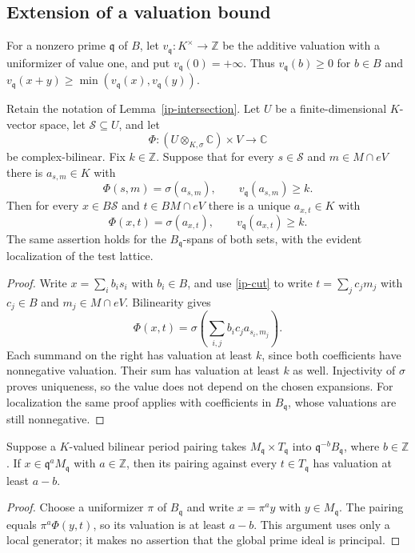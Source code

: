 \subsection{Extension of a valuation bound}

For a nonzero prime $\mathfrak q$ of $B$, let
$v_{\mathfrak q}:K^\times\to\mathbb Z$ be the additive valuation
with a uniformizer of value one, and put $v_{\mathfrak q}(0)=+\infty$.
Thus $v_{\mathfrak q}(b)\ge0$ for $b\in B$ and
$v_{\mathfrak q}(x+y)\ge\min(v_{\mathfrak q}(x),v_{\mathfrak q}(y))$.

\begin{proposition}\label{ip-valuation}
Retain the notation of Lemma~\ref{ip-intersection}. Let $U$ be a
finite-dimensional $K$-vector space, let $\mathcal S\subseteq U$,
and let
\[
 \Phi:(U\otimes_{K,\sigma}\mathbb C)\times V\longrightarrow\mathbb C
\]
be complex-bilinear. Fix $k\in\mathbb Z$. Suppose that for every
$s\in\mathcal S$ and $m\in M\cap eV$ there is $a_{s,m}\in K$
with
\[
       \Phi(s,m)=\sigma(a_{s,m}),\qquad
                         v_{\mathfrak q}(a_{s,m})\ge k.
\]
Then for every $x\in B\mathcal S$ and $t\in BM\cap eV$ there is
a unique $a_{x,t}\in K$ with
\[
       \Phi(x,t)=\sigma(a_{x,t}),\qquad
                         v_{\mathfrak q}(a_{x,t})\ge k.
\]
The same assertion holds for the $B_{\mathfrak q}$-spans of both
sets, with the evident localization of the test lattice.
\end{proposition}
\begin{proof}
Write $x=\sum_i b_is_i$ with $b_i\in B$, and use
\eqref{ip-cut} to write $t=\sum_j c_jm_j$ with $c_j\in B$ and
$m_j\in M\cap eV$. Bilinearity gives
\[
       \Phi(x,t)=\sigma\left(\sum_{i,j}b_ic_ja_{s_i,m_j}\right).
\]
Each summand on the right has valuation at least $k$, since
both coefficients have nonnegative valuation. Their sum has
valuation at least $k$ as well. Injectivity of $\sigma$ proves
uniqueness, so the value does not depend on the chosen expansions.
For localization the same proof applies with coefficients in
$B_{\mathfrak q}$, whose valuations are still nonnegative.
\end{proof}

\begin{corollary}\label{ip-scaling}
Suppose a $K$-valued bilinear period pairing takes
$M_{\mathfrak q}\times T_{\mathfrak q}$ into
$\mathfrak q^{-b}B_{\mathfrak q}$, where $b\in\mathbb Z$.
If $x\in\mathfrak q^aM_{\mathfrak q}$ with $a\in\mathbb Z$,
then its pairing against every $t\in T_{\mathfrak q}$ has
valuation at least $a-b$.
\end{corollary}
\begin{proof}
Choose a uniformizer $\pi$ of $B_{\mathfrak q}$ and write
$x=\pi^a y$ with $y\in M_{\mathfrak q}$. The pairing equals
$\pi^a\Phi(y,t)$, so its valuation is at least $a-b$.
This argument uses only a local generator; it makes no assertion
that the global prime ideal is principal.
\end{proof}

